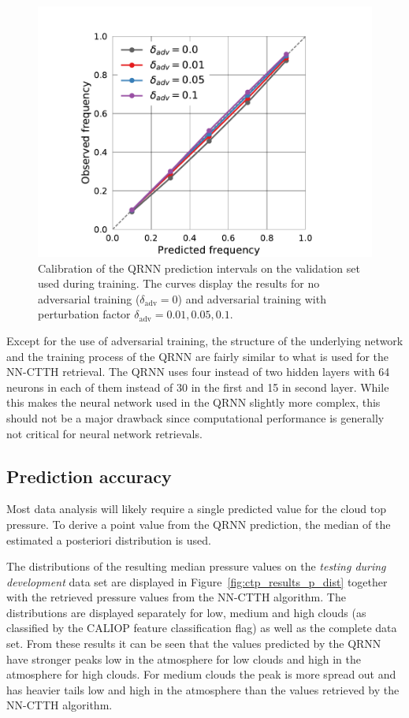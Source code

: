 \documentclass[journal abbreviation, manuscript]{copernicus}
\begin{document}
  \begin{figure}[hbpt!]
    \centering
    \includegraphics[width = 0.6\linewidth]{../plots/fig08}
    \caption{Calibration of the QRNN prediction intervals on the validation set
      used during training. The curves display the results for no adversarial training
      ($\delta_\text{adv} = 0$) and adversarial training with perturbation
      factor $\delta_\text{adv} = 0.01, 0.05, 0.1$.}
    \label{fig:validation_calibration}
  \end{figure}
  
Except for the use of adversarial training, the structure of the underlying
network and the training process of the QRNN are fairly similar to what is used
for the NN-CTTH retrieval. The QRNN uses four instead of two hidden layers with
64 neurons in each of them instead of 30 in the first and 15 in second layer.
While this makes the neural network used in the QRNN slightly more complex, this
should not be a major drawback since computational performance is generally not
critical for neural network retrievals.

\subsection{Prediction accuracy}

Most data analysis will likely require a single predicted value for the cloud top
pressure. To derive a point value from the QRNN prediction, the median of the
estimated a posteriori distribution is used.

The distributions of the resulting median pressure values 
on the \textit{testing during development} data set are displayed in
Figure~\ref{fig:ctp_results_p_dist} together with the retrieved pressure
values from the NN-CTTH algorithm. The distributions are displayed
separately for low, medium and high clouds (as classified by the CALIOP
feature classification flag) as well as the complete data set. From these
results it can be seen that the values predicted by the QRNN have stronger peaks
low in the atmosphere for low clouds and high in the atmosphere for
high clouds. For medium clouds the peak is more spread out and has heavier
tails low and high in the atmosphere than the values retrieved by the NN-CTTH
algorithm.
\end{document}
